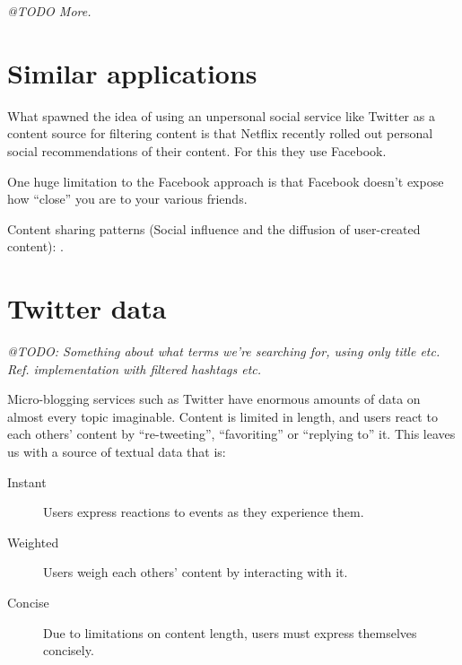 
\emph{@TODO More.}


\section{Similar applications} %
\label{sec:similar_applications}

What spawned the idea of using an unpersonal social service like Twitter as a content source for filtering content is that Netflix recently rolled out personal social recommendations of their content.
For this they use Facebook.

One huge limitation to the Facebook approach is that Facebook doesn't expose how ``close'' you are to your various friends.

Content sharing patterns (Social influence and the diffusion of user-created content): \cite{Bakshy2009}.



\section{Twitter data} %
\label{sec:twitter_data}



\emph{@TODO: Something about what terms we're searching for, using only title etc. Ref. implementation with filtered hashtags etc.}



Micro-blogging services such as Twitter have enormous amounts of data on almost every topic imaginable.
Content is limited in length, and users react to each others' content by ``re-tweeting'', ``favoriting'' or ``replying to'' it.
This leaves us with a source of textual data that is:

\begin{description}
  \item[Instant] Users express reactions to events as they experience them.
  \item[Weighted] Users weigh each others' content by interacting with it.
  \item[Concise] Due to limitations on content length, users must express themselves concisely.
\end{description}


